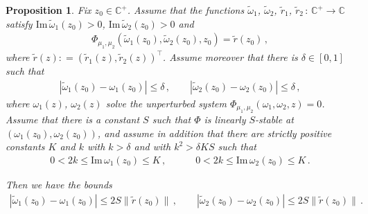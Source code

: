 \documentclass[10pt,reqno]{amsart}
\numberwithin{equation}{section}
\theoremstyle{plain}
\newtheorem{proposition}[theorem]{Proposition}
\numberwithin{kevin}{section}
\theoremstyle{remark}
\newcommand{\im}{\mathrm{Im}\,}
\newcommand{\C}{{\mathbb C}}
\newcommand{\deq}{\mathrel{\mathop:}=}
\newcommand{\PP}{\Phi}
\begin{document}
\begin{proposition}\label{le proposition perturbation of system}
Fix $z_0\in\C^+$. Assume that the functions $\widetilde\omega_1$, $\widetilde\omega_2$, $\widetilde{r}_1$, $\widetilde{r}_2\,:\,\C^+\rightarrow \C$ satisfy $\im\widetilde\omega_1(z_0)>0$, $\im\widetilde\omega_2(z_0)>0$ and 
 \begin{align}\label{la perturbed system}
 \PP_{\mu_1,\mu_2}(\widetilde\omega_1(z_0),\widetilde\omega_2(z_0),z_0)=\widetilde r(z_0)\,,
 \end{align}
where $\widetilde{r}(z)\deq(\widetilde r_1(z),\widetilde r_2(z))^\top$. Assume moreover that there is $\delta\in[0,1]$ such that
 \begin{align}\label{le apriori closeness}
 |\widetilde\omega_1(z_0)-\omega_1(z_0)|\le \delta\,,\qquad |\widetilde\omega_2(z_0)-\omega_2(z_0)|\le \delta\,,  
 \end{align}
 where $\omega_1(z)$, $\omega_2(z)$ solve the unperturbed system $\PP_{\mu_1,\mu_2}(\omega_1,\omega_2,z)=0$. Assume that there is a constant $S$ such that $\PP$ is linearly $S$-stable at $(\omega_1(z_0),\omega_2(z_0))$, and assume in addition that there are strictly positive constants $K$ and $k$ with $k>\delta$ and with $k^2>\delta KS$ such that
\begin{align}\label{le stability sum ims}
0<2k\le \im \omega_1(z_0)\le K \,,\qquad\quad 0<2k\le \im \omega_2(z_0)\le K \,.
 \end{align}
 
Then we have the bounds
\begin{align}\label{le conclusion of lemma}
 |\widetilde\omega_1(z_0)-\omega_1(z_0)|\le  2S \|\widetilde{r}(z_0)\|\,,\qquad|\widetilde\omega_2(z_0)-\omega_2(z_0)|\le  2S \|\widetilde{r}(z_0)\|\,.
\end{align} 
\end{proposition}
\end{document}
